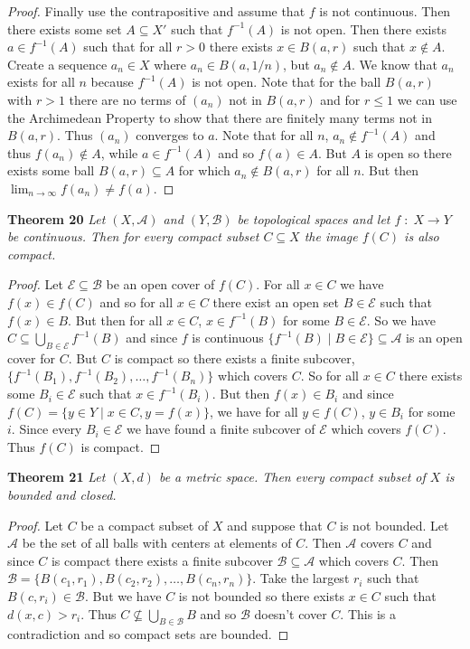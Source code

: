 \documentclass{article}
\begin{document}
\begin{flushleft}
\begin{proof}
Finally use the contrapositive and assume that $f$ is not continuous. Then there exists some set $A \subseteq X'$ such that $f^{-1}(A)$ is not open. Then there exists $a \in f^{-1}(A)$ such that for all $r>0$ there exists $x \in B(a,r)$ such that $x \notin A$. Create a sequence $a_n \in X$ where $a_n \in B(a, 1/n)$, but $a_n \notin A$. We know that $a_n$ exists for all $n$ because $f^{-1}(A)$ is not open. Note that for the ball $B(a,r)$ with $r>1$ there are no terms of $(a_n)$ not in $B(a,r)$ and for $r \leq 1$ we can use the Archimedean Property to show that there are finitely many terms not in $B(a,r)$. Thus $(a_n)$ converges to $a$. Note that for all $n$, $a_n \notin f^{-1}(A)$ and thus $f(a_n) \notin A$, while $a \in f^{-1}(A)$ and so $f(a) \in A$. But $A$ is open so there exists some ball $B(a,r) \subseteq A$ for which $a_n \notin B(a,r)$ for all $n$. But then $\lim_{n \rightarrow \infty} f(a_n) \neq f(a)$.
\end{proof}

\textbf{Theorem 20}
\textsl{Let $(X, \mathcal{A})$ and $(Y, \mathcal{B})$ be topological spaces and let $f \; : \; X \rightarrow Y$ be continuous. Then for every compact subset $C \subseteq X$ the image $f(C)$ is also compact.}
\begin{proof}
Let $\mathcal{E} \subseteq \mathcal{B}$ be an open cover of $f(C)$. For all $x \in C$ we have $f(x) \in f(C)$ and so for all $x \in C$ there exist an open set $B \in \mathcal{E}$ such that $f(x) \in B$. But then for all $x \in C$, $x \in f^{-1}(B)$ for some $B \in \mathcal{E}$. So we have $C \subseteq \bigcup_{B \in \mathcal{E}} f^{-1}(B)$ and since $f$ is continuous $\{f^{-1}(B) \mid B \in \mathcal{E}\} \subseteq \mathcal{A}$ is an open cover for $C$. But $C$ is compact so there exists a finite subcover, $\{f^{-1}(B_1), f^{-1}(B_2), \dots , f^{-1}(B_n)\}$ which covers $C$. So for all $x \in C$ there exists some $B_i \in \mathcal{E}$ such that $x \in f^{-1}(B_i)$. But then $f(x) \in B_i$ and since $f(C) = \{ y \in Y \mid x \in C, y=f(x) \}$, we have for all $y \in f(C)$, $y \in B_i$ for some $i$. Since every $B_i \in \mathcal{E}$ we have found a finite subcover of $\mathcal{E}$ which covers $f(C)$. Thus $f(C)$ is compact.
\end{proof}

\textbf{Theorem 21}
\textsl{Let $(X, d)$ be a metric space. Then every compact subset of $X$ is bounded and closed.}
\begin{proof}
Let $C$ be a compact subset of $X$ and suppose that $C$ is not bounded. Let $\mathcal{A}$ be the set of all balls with centers at elements of $C$. Then $\mathcal{A}$ covers $C$ and since $C$ is compact there exists a finite subcover $\mathcal{B} \subseteq \mathcal{A}$ which covers $C$. Then $\mathcal{B} = \{B(c_1,r_1), B(c_2,r_2), \dots , B(c_n,r_n)\}$. Take the largest $r_i$ such that $B(c,r_i) \in \mathcal{B}$. But we have $C$ is not bounded so there exists $x \in C$ such that $d(x,c) > r_i$. Thus $C \nsubseteq \bigcup_{B \in \mathcal{B}} B$ and so $\mathcal{B}$ doesn't cover $C$. This is a contradiction and so compact sets are bounded.\newline


\end{proof}
\end{flushleft}
\end{document}

